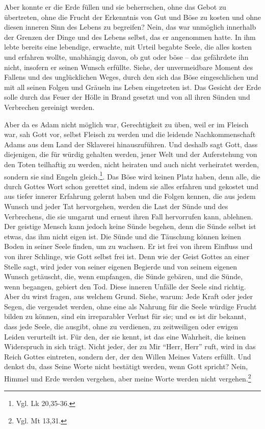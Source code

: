Aber konnte er die Erde füllen und sie beherrschen, ohne das Gebot zu übertreten, ohne die Frucht der Erkenntnis von Gut und Böse zu kosten und ohne diesen inneren Sinn des Lebens zu begreifen? Nein, das war unmöglich innerhalb der Grenzen der Dinge und des Lebens selbst, das er angenommen hatte. In ihm lebte bereits eine lebendige, erwachte, mit Urteil begabte Seele, die alles kosten und erfahren wollte, unabhängig davon, ob gut oder böse -- das gefährdete ihn nicht, insofern er seinen Wunsch erfüllte. Siehe, der unvermeidbare Moment des Fallens und des unglücklichen Weges, durch den sich das Böse eingeschlichen und mit all seinen Folgen und Gräueln ins Leben eingetreten ist. Das Gesicht der Erde solle durch das Feuer der Hölle in Brand gesetzt und von all ihren Sünden und Verbrechen gereinigt werden.

Aber da es Adam nicht möglich war, Gerechtigkeit zu üben, weil er im Fleisch war, sah Gott vor, selbst Fleisch zu werden und die leidende Nachkommenschaft Adams aus dem Land der Sklaverei hinauszuführen. Und deshalb sagt Gott, dass diejenigen, die für würdig gehalten werden, jener Welt und der Auferstehung von den Toten teilhaftig zu werden, nicht heiraten und auch nicht verheiratet werden, sondern sie sind Engeln gleich.\footnote{Vgl. Lk 20,35-36.}. Das Böse wird keinen Platz haben, denn alle, die durch Gottes Wort schon gerettet sind, indem sie alles erfahren und gekostet und aus tiefer innerer Erfahrung gelernt haben und die Folgen kennen, die aus jedem Wunsch und jeder Tat hervorgehen, werden die Last der Sünde und des Verbrechens, die sie umgarnt und erneut ihren Fall hervorrufen kann, ablehnen. Der geistige Mensch kann jedoch keine Sünde begehen, denn die Sünde selbst ist etwas, das ihm nicht eigen ist. Die Sünde und die Täuschung können keinen Boden in seiner Seele finden, um zu wachsen. Er ist frei von ihrem Einfluss und von ihrer Schlinge, wie Gott selbst frei ist. Denn wie der Geist Gottes an einer Stelle sagt, wird jeder von seiner eigenen Begierde und von seinem eigenen Wunsch getäuscht, die, wenn empfangen, die Sünde gebären, und die Sünde, wenn begangen, gebiert den Tod. Diese inneren Unfälle der Seele sind richtig. Aber du wirst fragen, aus welchem Grund. Siehe, warum: Jede Kraft oder jeder Segen, die vergeudet werden, ohne eine als Nahrung für die Seele würdige Frucht bilden zu können, sind ein irreparabler Verlust für sie; und es ist dir bekannt, dass jede Seele, die ausgibt, ohne zu verdienen, zu zeitweiligen oder ewigen Leiden verurteilt ist. Für den, der sie kennt, ist das eine Wahrheit, die keinen Widerspruch in sich trägt. Nicht jeder, der zu Mir "`Herr, Herr"' ruft, wird in das Reich Gottes eintreten, sondern der, der den Willen Meines Vaters erfüllt. Und denkst du, dass Seine Worte nicht bestätigt werden, wenn Gott spricht? Nein, Himmel und Erde werden vergehen, aber meine Worte werden nicht vergehen.\footnote{Vgl. Mt 13,31.}

